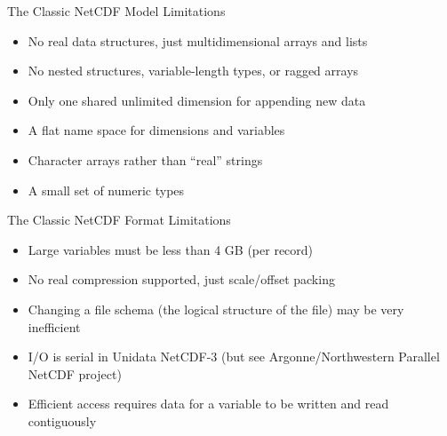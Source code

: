 \documentclass[compress,11pt,xcolor=svgnames,aspectratio=169]{beamer}
\begin{document}
\begin{frame}[t]{The Classic NetCDF Model Limitations}

    \begin{itemize}
    \setlength\itemsep{0.4cm}
        \item No real data structures, just multidimensional arrays and lists
        \item No nested structures, variable-length types, or ragged arrays
        \item Only one shared unlimited dimension for appending new data
        \item A flat name space for dimensions and variables
        \item Character arrays rather than ``real'' strings
        \item A small set of numeric types
    \end{itemize}

\end{frame}

\begin{frame}[t]{The Classic NetCDF Format Limitations}

    \begin{itemize}
    \setlength\itemsep{0.4cm}
        \item Large variables must be less than 4 GB (per record)
        \item No real compression supported, just scale/offset packing
        \item Changing a file schema (the logical structure of the file) may be very inefficient
        \item I/O is serial in Unidata NetCDF-3 (but see Argonne/Northwestern Parallel NetCDF project)
        \item Efficient access requires data for a variable to be written and read contiguously
    \end{itemize}

\end{frame}
\end{document}
